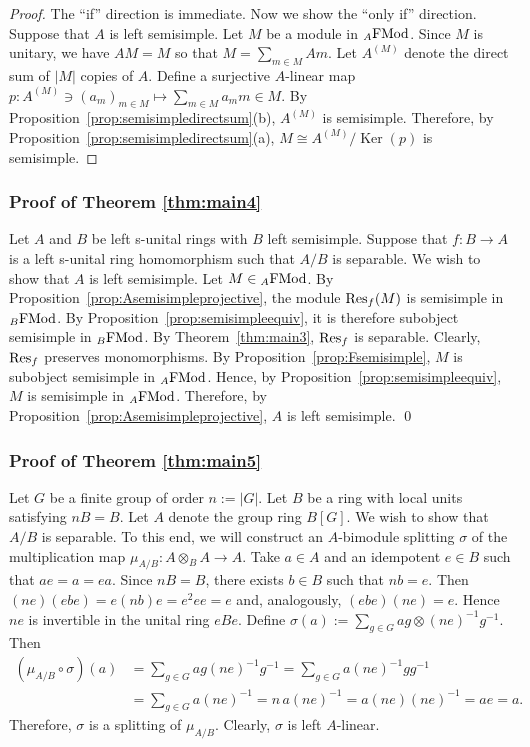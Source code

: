\documentclass[12pt]{amsart}
\theoremstyle{definition}
\newcommand{\FMod}{{\rm FMod}}
\newcommand{\Res}{{\rm Res}}
\DeclareMathOperator{\Ker}{Ker}
\begin{document}
\begin{proof}
The ``if'' direction is immediate.
Now we show the ``only if'' direction.
Suppose that $A$ is left semisimple.
Let $M$ be a module in ${}_A \FMod$. 
Since $M$ is unitary, we have $AM=M$ so that
$M=\sum_{m \in M}Am$.
Let $A^{(M)}$ denote the direct sum 
of $|M|$ copies of $A$. 
Define a surjective $A$-linear map
$p : A^{(M)} \ni (a_m)_{m \in M} \mapsto 
\sum_{m \in M} a_m m \in M$.
By Proposition~\ref{prop:semisimpledirectsum}(b), 
$A^{(M)}$ is semisimple.
Therefore, by Proposition~\ref{prop:semisimpledirectsum}(a),
$M \cong A^{(M)}/\Ker(p)$ is semisimple.
\end{proof}

\subsubsection*{Proof of Theorem \ref{thm:main4}}
Let $A$ and $B$ be left s-unital rings
with $B$ left semisimple.
Suppose that $f : B \to A$ is a left s-unital 
ring homomorphism such that $A/B$ 
is separable. We wish to show that $A$ is left semisimple.
Let $M \in {}_A\FMod$.
By Proposition~\ref{prop:Asemisimpleprojective}, the module $\Res_f(M)$ is semisimple in ${}_B\FMod$.
By Proposition~\ref{prop:semisimpleequiv}, it is 
therefore subobject semisimple in ${}_B\FMod$.
By Theorem~\ref{thm:main3}, $\Res_f$ is separable.
Clearly, $\Res_f$ preserves monomorphisms.
By Proposition~\ref{prop:Fsemisimple}, $M$ is subobject semisimple in ${}_A\FMod$.
Hence, by Proposition~\ref{prop:semisimpleequiv}, $M$ is semisimple in ${}_A\FMod$.
Therefore, by Proposition~\ref{prop:Asemisimpleprojective}, $A$ is left semisimple. \qed

\subsubsection*{Proof of Theorem \ref{thm:main5}}
Let $G$ be a finite group 
of order $n:=|G|$.
Let $B$ be a ring with local units
satisfying $nB = B$. 
Let $A$ denote the group ring $B[G]$. 
We wish to show that $A/B$ is separable.
To this end, we will
construct an $A$-bimodule splitting $\sigma$ of the multiplication map
$\mu_{A/B} : A \otimes_B A \to A$.
Take $a \in A$ and an idempotent $e \in B$ such that $ae=a=ea$.
Since $nB=B$, there exists $b \in B$ such that $nb=e$.
Then $(ne)(ebe)=e(nb)e=e^2ee=e$ and, analogously,
$(ebe)(ne)=e$.
Hence $ne$ is invertible in the unital ring $eBe$.
Define
$\sigma(a):=\sum_{g\in G} ag \otimes (ne)^{-1}g^{-1}$.
Then
\[
\begin{aligned}
(\mu_{A/B}\circ \sigma)(a)
&=
\sum_{g\in G} ag(ne)^{-1}g^{-1} 
=
\sum_{g\in G} a(ne)^{-1}gg^{-1} \\
&=
\sum_{g\in G} a(ne)^{-1} 
=
n\,a(ne)^{-1} 
=
a(ne)(ne)^{-1} 
= ae = a.
\end{aligned}
\]
Therefore, $\sigma$ is a splitting of $\mu_{A/B}$.
Clearly, $\sigma$ is left $A$-linear.
\end{document}
